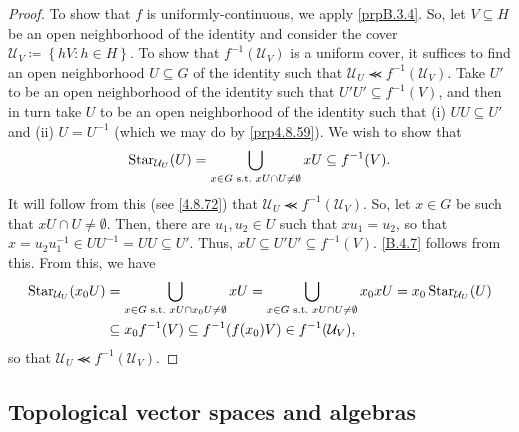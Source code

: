 \begin{prp}
\begin{savenotes}
\begin{proof}
To show that $f$ is uniformly-continuous, we apply \cref{prpB.3.4}.  So, let $V\subseteq H$ be an open neighborhood of the identity and consider the cover $\mathcal{U}_V\coloneqq \left\{ hV:h\in H\right\}$.  To show that $f^{-1}(\mathcal{U}_V)$ is a uniform cover, it suffices to find an open neighborhood $U\subseteq G$ of the identity such that $\mathcal{U}_U\llcurly f^{-1}(\mathcal{U}_V)$.  Take $U'$ to be an open neighborhood of the identity such that $U'U'\subseteq f^{-1}(V)$, and then in turn take $U$ to be an open neighborhood of the identity such that (i) $UU\subseteq U'$ and (ii) $U=U^{-1}$ (which we may do by \cref{prp4.8.59}).  We wish to show that
\begin{equation}\label{B.4.7}
\operatorname{Star} _{\mathcal{U}_U}(U)=\bigcup _{x\in G\text{ s.t.~} xU\cap U\neq \emptyset}xU\subseteq f^{-1}(V).
\end{equation}
It will follow from this (see \eqref{4.8.72}) that $\mathcal{U}_U\llcurly f^{-1}(\mathcal{U}_V)$.  So, let $x\in G$ be such that $xU\cap U\neq \emptyset$.  Then, there are $u_1,u_2\in U$ such that $xu_1=u_2$, so that $x=u_2u_1^{-1}\in UU^{-1}=UU\subseteq U'$.  Thus, $xU\subseteq U'U'\subseteq f^{-1}(V)$.  \eqref{B.4.7} follows from this.  From this, we have
\begin{equation}\label{4.8.72}
\begin{split}
\operatorname{Star} _{\mathcal{U}_U}(x_0U) & =\bigcup _{x\in G\text{ s.t.~} xU\cap x_0U\neq \emptyset}xU=\bigcup _{x\in G\text{ s.t.~} xU\cap U\neq \emptyset}x_0xU=x_0\operatorname{Star} _{\mathcal{U}_U}(U) \\
& \subseteq x_0f^{-1}(V)\subseteq f^{-1}(f(x_0)V)\in f^{-1}(\mathcal{U}_V),
\end{split}
\end{equation}
so that $\mathcal{U}_U\llcurly f^{-1}(\mathcal{U}_V)$.
\end{proof}
\end{savenotes}
\end{prp}

\subsection{Topological vector spaces and algebras}

